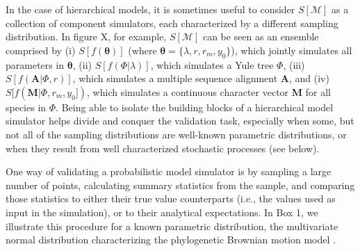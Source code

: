 \documentclass[oneside]{article}
\begin{document}
In the case of hierarchical models, it is sometimes useful
to consider $S[\mathcal{M}]$ as a collection of component
simulators, each characterized by a different sampling distribution.
In figure X, for example, $S[\mathcal{M}]$ can be seen as an ensemble
comprised by (i) $S[f(\boldsymbol{\theta})]$ (where $\boldsymbol{\theta} = \{\lambda, r, r_m,
y_0\}$), which jointly simulates all parameters in $\boldsymbol{\theta}$,
(ii) $S[f(\Phi|\lambda)]$, which simulates a Yule tree $\Phi$, (iii)
$S[f(\mathbf{A}|\Phi,r)]$, which simulates a multiple sequence
alignment $\mathbf{A}$, and (iv) $S[f(\mathbf{M}|\Phi,r_m,y_0])$,
which simulates a continuous character vector $\mathbf{M}$ for all
species in $\Phi$.
Being able to isolate the building blocks of a hierarchical model simulator 
helps divide and conquer the validation task, especially when some, but
not all of the sampling distributions are well-known parametric distributions,
or when they result from well characterized stochastic processes (see below).

One way of validating a probabilistic model simulator is by 
sampling a large number of points, calculating summary statistics from the
sample, and comparing those statistics to either their true value
counterparts (i.e., the values used as input in the simulation), or to
their analytical expectations.
In Box 1, we illustrate this procedure for a known parametric distribution,
the multivariate normal distribution characterizing the phylogenetic
Brownian motion model \citep{felsenstein73}.

\vspace{.5cm}
\end{document}
